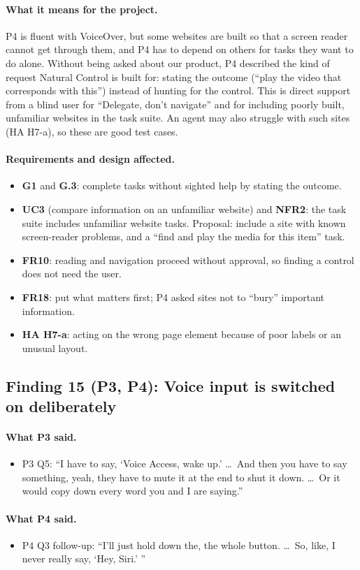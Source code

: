 \documentclass[12pt, titlepage]{article}
\newcommand{\saidthree}{\paragraph{What P3 said.}}
\newcommand{\saidfour}{\paragraph{What P4 said.}}
\newcommand{\means}{\paragraph{What it means for the project.}}
\newcommand{\affects}{\paragraph{Requirements and design affected.}}
\begin{document}
\means
P4 is fluent with VoiceOver, but some websites are built so that a screen reader cannot get through them, and P4 has to depend on others for tasks they want to do alone. Without being asked about our product, P4 described the kind of request Natural Control is built for: stating the outcome (``play the video that corresponds with this'') instead of hunting for the control. This is direct support from a blind user for ``Delegate, don't navigate'' and for including poorly built, unfamiliar websites in the task suite. An agent may also struggle with such sites (HA H7-a), so these are good test cases.

\affects
\begin{itemize}
    \item \textbf{G1} and \textbf{G.3}: complete tasks without sighted help by stating the outcome.
    \item \textbf{UC3} (compare information on an unfamiliar website) and \textbf{NFR2}: the task suite includes unfamiliar website tasks. Proposal: include a site with known screen-reader problems, and a ``find and play the media for this item'' task.
    \item \textbf{FR10}: reading and navigation proceed without approval, so finding a control does not need the user.
    \item \textbf{FR18}: put what matters first; P4 asked sites not to ``bury'' important information.
    \item \textbf{HA H7-a}: acting on the wrong page element because of poor labels or an unusual layout.
\end{itemize}

\subsection{Finding 15 (P3, P4): Voice input is switched on deliberately}

\saidthree
\begin{itemize}
    \item P3 Q5: ``I have to say, `Voice Access, wake up.' \ldots\ And then you have to say something, yeah, they have to mute it at the end to shut it down. \ldots\ Or it would copy down every word you and I are saying.''
\end{itemize}

\saidfour
\begin{itemize}
    \item P4 Q3 follow-up: ``I'll just hold down the, the whole button. \ldots\ So, like, I never really say, `Hey, Siri.' ''
\end{itemize}
\end{document}
